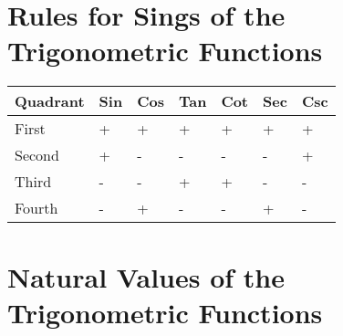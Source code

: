 \section{Rules for Sings of the Trigonometric Functions}
\label{sec:1:3:rules-for-signs-of-the-trigonometric-functions}

\begin{center}
\begin{tabular}{l|llllll}
Quadrant & Sin & Cos & Tan & Cot & Sec & Csc \\ \hline
First    &	+  &	+  &	+  &	+  &	+  &	+  \\
Second   &  +  &	-  &	-  &	-  &	-  &	+  \\
Third    &	-  &	-  &	+  &	+  &	-  &	-  \\
Fourth   &  -  &	+  &	-  &	-  &	+  &  -  \\
\end{tabular}
\end{center}

\section{Natural Values of the Trigonometric Functions}
\label{sec:1:3:natural-values-of-the-trigonometric-functions}

